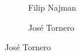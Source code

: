 \begin{frame}[plain]
\begin{figure}[h]
\begin{subfigure}{0.25\textwidth}
	\caption{Filip Najman}
	\end{subfigure} \quad\quad
	\begin{subfigure}{0.25\textwidth}
	\captionsetup{labelformat=empty}
	\centering
	\caption{Jos\'e Tornero}
	\end{subfigure}
	\end{figure}
\end{frame}



